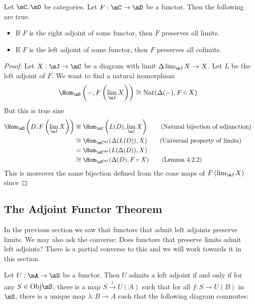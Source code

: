 \documentclass[a4paper]{article}
\begin{document}
\begin{prp}{}{} Let $\mC,\mD$ be categories. Let $F:\mC\to\mD$ be a functor. Then the following are true. 
\begin{itemize}
\item If $F$ is the right adjoint of some functor, then $F$ preserves all limits. 
\item If $F$ is the left adjoint of some functor, then $F$ preserves all colimits. 
\end{itemize} 
\begin{proof}
Let $X:\mJ\to\mC$ be a diagram with limit $\Delta\lim_\mJ X\to X$. Let $L$ be the left adjoint of $F$. We want to find a natural isomorphism $$\Hom_\mD\left(-,F\left(\lim_\mJ X\right)\right)\cong\text{Nat}(\Delta(-),F\circ X)$$
But this is true sine
\begin{align*}
\Hom_\mD\left(D,F\left(\lim_\mJ X\right)\right)&\cong\Hom_\mC\left(L(D),\lim_\mJ X\right)\tag{Natural bijection of adjunction}\\
&\cong\Hom_{\mC^\mJ}(\Delta(L(D)),X)\tag{Universal property of limits}\\
&=\Hom_{\mC^\mJ}(L(\Delta(D)),X)\\
&\cong\Hom_{\mD^\mJ}(\Delta(D),F\circ X)\tag{Lemma 4.2.2}
\end{align*}
This is moreover the same bijection defined from the cone maps of $F\left(\lim_\mJ X\right)$ since
\end{proof}
\end{prp}

\subsection{The Adjoint Functor Theorem}
In the previous section we saw that functors that admit left adjoints preserve limits. We may also ask the converse: Does functors that preserve limits admit left adjoints? There is a partial converse to this and we will work towards it in this section. 

\begin{lmm}{}{} Let $U:\mA\to\mS$ be a functor. Then $U$ admits a left adjoint if and only if for any $S\in\text{Obj}\mS$, there is a map $S\overset{i}{\to}U(A)$ such that for all $f:S\to U(B)$ in $\mS$, there is a unique map $\lambda:B\to A$ such that the following diagram commutes: \\
\end{lmm}
\end{document}
